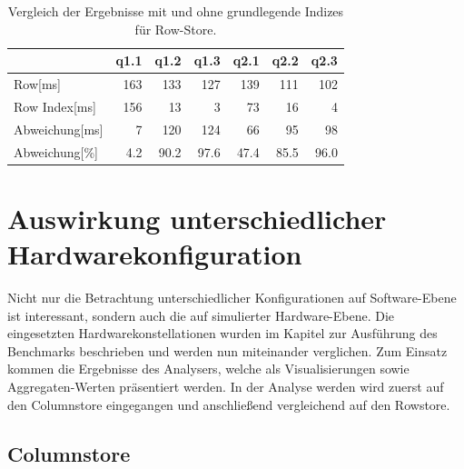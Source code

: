 \begin{table}[H]
    \begin{tabularx}{\linewidth}{lrrrrrr}
        \toprule
                &   q1.1    &   q1.2&	q1.3&	q2.1&	q2.2&	q2.3 \\
        \toprule
        Row[ms]	        &	163	    &	133	&	127	&	139	&	111	&	102  \\
        Row Index[ms]   &   156     &   13	&   3	&   73	&   16	&   4    \\
        Abweichung[ms]  &   7       &   120 &   124 &   66  &   95  &   98   \\
        Abweichung[\%]  &   4.2     &   90.2&   97.6&   47.4&   85.5&   96.0 \\    
\bottomrule
\end{tabularx}
\caption{Vergleich der Ergebnisse mit und ohne grundlegende Indizes für Row-Store.}
\label{tab:basic_index_row}
\end{table}
\section{Auswirkung unterschiedlicher Hardwarekonfiguration}\label{auswertung:hardware}

Nicht nur die Betrachtung unterschiedlicher Konfigurationen auf Software-Ebene ist interessant, sondern auch die auf simulierter Hardware-Ebene. Die eingesetzten Hardwarekonstellationen wurden im Kapitel zur Ausführung des Benchmarks beschrieben und werden nun miteinander verglichen. Zum Einsatz kommen die Ergebnisse des Analysers, welche als Visualisierungen sowie Aggregaten-Werten präsentiert werden. In der Analyse werden wird zuerst auf den Columnstore eingegangen und anschließend vergleichend auf den Rowstore. 

\subsection{Columnstore}

\begin{figure}[H]
\end{figure}



